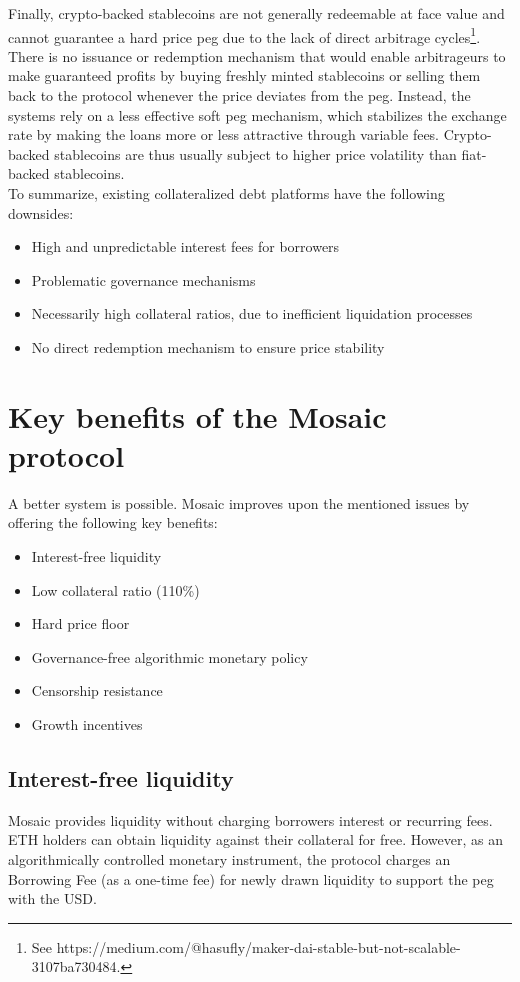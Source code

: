\documentclass{article}
\begin{document}
Finally, crypto-backed stablecoins are not generally redeemable at face value and cannot guarantee a hard price peg due to the lack of direct arbitrage cycles\footnote{See https://medium.com/@hasufly/maker-dai-stable-but-not-scalable-3107ba730484.}. There is no issuance or redemption mechanism that would enable arbitrageurs to make guaranteed profits by buying freshly minted stablecoins or selling them back to the protocol whenever the price deviates from the peg. Instead, the systems rely on a less effective soft peg mechanism, which stabilizes the exchange rate by making the loans more or less attractive through variable fees. Crypto-backed stablecoins are thus usually subject to higher price volatility than fiat-backed stablecoins.\\

To summarize, existing collateralized debt platforms have the following downsides:
\begin{itemize}
    \item High and unpredictable interest fees for borrowers
    \item Problematic governance mechanisms
    \item Necessarily high collateral ratios, due to inefficient liquidation processes
    \item No direct redemption mechanism to ensure price stability
\end{itemize}
 
\section{Key benefits of the Mosaic protocol}
A better system is possible. Mosaic improves upon the mentioned issues by offering the following key benefits:
\begin{itemize}
    \item Interest-free liquidity
    \item Low collateral ratio (110\%)
    \item Hard price floor
    \item Governance-free algorithmic monetary policy
    \item Censorship resistance
    \item Growth incentives
\end{itemize}

\subsection{Interest-free liquidity}
Mosaic provides liquidity without charging borrowers interest or recurring fees. ETH holders can obtain liquidity against their collateral for free. However, as an algorithmically controlled monetary instrument, the protocol charges an Borrowing Fee (as a one-time fee) for newly drawn liquidity to support the peg with the USD.
\end{document}
